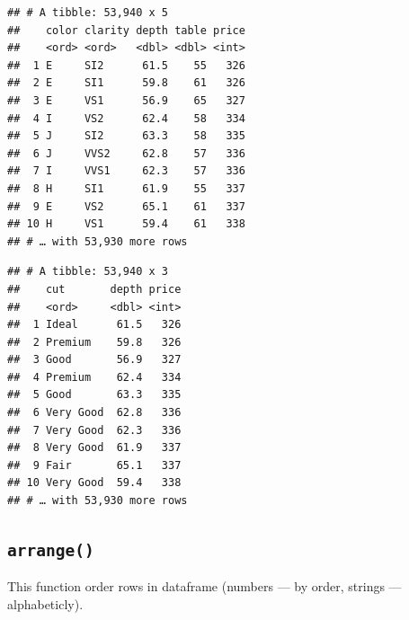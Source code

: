 \documentclass[
]{book}
\newenvironment{Shaded}{\begin{snugshade}}{\end{snugshade}}
\newcommand{\KeywordTok}[1]{\textcolor[rgb]{0.13,0.29,0.53}{\textbf{#1}}}
\newcommand{\NormalTok}[1]{#1}
\newcommand{\OperatorTok}[1]{\textcolor[rgb]{0.81,0.36,0.00}{\textbf{#1}}}
\newcommand{\StringTok}[1]{\textcolor[rgb]{0.31,0.60,0.02}{#1}}
\begin{document}
\begin{Shaded}
\end{Shaded}

\begin{verbatim}
## # A tibble: 53,940 x 5
##    color clarity depth table price
##    <ord> <ord>   <dbl> <dbl> <int>
##  1 E     SI2      61.5    55   326
##  2 E     SI1      59.8    61   326
##  3 E     VS1      56.9    65   327
##  4 I     VS2      62.4    58   334
##  5 J     SI2      63.3    58   335
##  6 J     VVS2     62.8    57   336
##  7 I     VVS1     62.3    57   336
##  8 H     SI1      61.9    55   337
##  9 E     VS2      65.1    61   337
## 10 H     VS1      59.4    61   338
## # … with 53,930 more rows
\end{verbatim}

\begin{Shaded}
\end{Shaded}

\begin{verbatim}
## # A tibble: 53,940 x 3
##    cut       depth price
##    <ord>     <dbl> <int>
##  1 Ideal      61.5   326
##  2 Premium    59.8   326
##  3 Good       56.9   327
##  4 Premium    62.4   334
##  5 Good       63.3   335
##  6 Very Good  62.8   336
##  7 Very Good  62.3   336
##  8 Very Good  61.9   337
##  9 Fair       65.1   337
## 10 Very Good  59.4   338
## # … with 53,930 more rows
\end{verbatim}

\hypertarget{arrange}{%
\subsection{\texorpdfstring{\texttt{arrange()}}{arrange()}}\label{arrange}}

This function order rows in dataframe (numbers --- by order, strings --- alphabeticly).

\begin{Shaded}
\end{Shaded}
\end{document}
